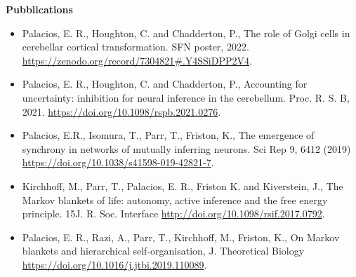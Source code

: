 \documentclass[11pt,usenames, dvipsnames]{article}
\begin{document}
{\large \bfseries Pubblications}
\begin{itemize}
  \item Palacios, E. R., Houghton, C. and Chadderton, P., The role of Golgi cells in cerebellar cortical transformation. SFN poster, 2022. \url{https://zenodo.org/record/7304821#.Y4SSiDPP2V4}.
  \item Palacios, E. R., Houghton, C. and Chadderton, P., Accounting for uncertainty: inhibition for neural inference in the cerebellum. Proc. R. S. B, 2021. \url{https://doi.org/10.1098/rspb.2021.0276}.
  \item Palacios, E.R., Isomura, T., Parr, T., Friston, K., The emergence of synchrony in networks of mutually inferring neurons. Sci Rep 9, 6412 (2019) \url{https://doi.org/10.1038/s41598-019-42821-7}.
  \item Kirchhoff, M., Parr, T., Palacios, E. R., Friston K. and Kiverstein, J., The Markov blankets of life: autonomy, active inference and the free energy principle. 15J. R. Soc. Interface \url{http://doi.org/10.1098/rsif.2017.0792}.
  \item  Palacios, E. R., Razi, A., Parr, T., Kirchhoff, M., Friston, K., On Markov blankets and hierarchical self-organisation, J. Theoretical Biology \url{https://doi.org/10.1016/j.jtbi.2019.110089}.
\end{itemize}
\end{document}
